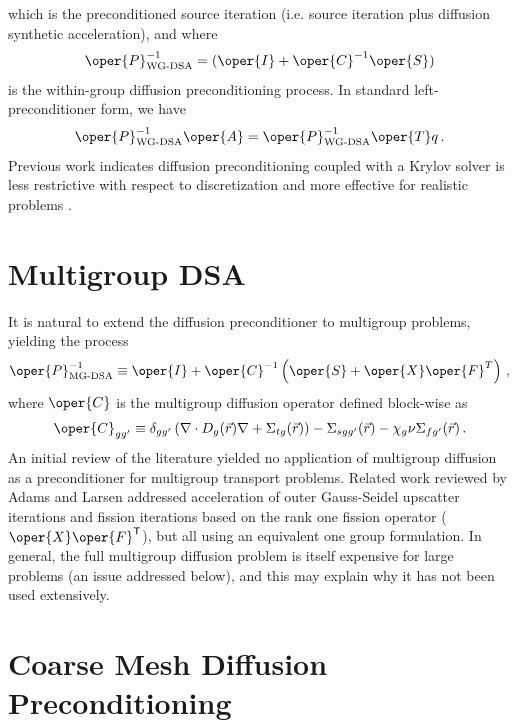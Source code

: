 which is the preconditioned source iteration (i.e. source iteration 
plus diffusion synthetic acceleration), and where
\begin{equation}
 \oper{P}^{-1}_{\text{WG-DSA}}
   = (\oper{I} + \oper{C}^{-1} \oper{S})
\end{equation}
is the within-group diffusion preconditioning process.  In standard 
left-preconditioner form, we have
\begin{equation}
  \oper{P}_{\text{WG-DSA}}^{-1}\oper{A}
   =  \oper{P}^{-1}_{\text{WG-DSA}} \oper{T} q \, .
\end{equation}
Previous work indicates diffusion preconditioning coupled with a 
Krylov solver is less restrictive with respect to discretization and more 
effective for realistic problems \cite{warsa2004kim}.

\section{Multigroup DSA}

It is natural to extend the diffusion preconditioner to multigroup 
problems, yielding the process
\begin{equation}
  \oper{P}^{-1}_{\text{MG-DSA}} \equiv 
    \oper{I} + \oper{C}^{-1} 
     \left(\oper{S} + \oper{X}\oper{F}^T\right) \, ,
\label{eq:mgdsa}
\end{equation}
where $\oper{C}$ is the multigroup diffusion operator 
defined block-wise as
\begin{equation}
 \oper{C}_{gg'} \equiv 
   \delta_{gg'} 
   \left( \nabla \cdot D_g(\vec{r}) \nabla + \Sigma_{tg}(\vec{r}) \right ) 
   - \Sigma_{sgg'}(\vec{r}) - \chi_g \nu\Sigma_{fg'}(\vec{r}) \, .
\end{equation}
An initial review of the literature yielded no application of
multigroup diffusion 
as a preconditioner for multigroup transport problems.  
Related work reviewed by Adams and Larsen \cite{adams2002fim} addressed
acceleration of outer Gauss-Seidel upscatter iterations and fission iterations
based on the rank one fission operator ($\oper{X}\oper{F}^{\transp}$),
but all using an equivalent one group formulation.  
In general, the full multigroup diffusion problem is itself expensive
for large problems (an issue addressed below), and this may explain why  
it has not been used extensively.  

\section{Coarse Mesh Diffusion Preconditioning}

